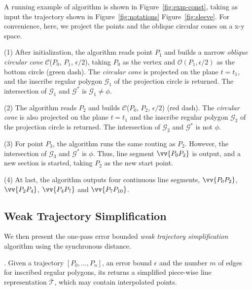 \begin{example}
\label{exm-alg-conest}
A running example of algorithm \cist is shown in Figure~\ref{fig:exm-const},  taking as input the trajectory shown in Figure~\ref{fig:notations} Figure~\ref{fig:sleeve}.
For convenience, here, we project the points and the oblique circular cones on a x-y space.

\ni (1) After initialization, the \cist algorithm reads point $P_1$ and builds a narrow \emph{oblique circular cone} $\mathcal{C}$($P_0$, $P_{1}$, $\epsilon/2$), taking $P_0$ as the vertex and $\mathcal{O}(P_1, \epsilon/2)$ as the bottom circle (green dash). The \emph{circular cone} is projected on the plane $t=t_1$, and the inscribe regular polygon $\mathcal{G}_1$ of the projection circle is returned. The intersection of $\mathcal{G}_1$ and $\mathcal{G}^*$ is $\mathcal{G}_1 \ne \phi$.

\ni (2) The algorithm reads $P_2$ and builds $\mathcal{C}$($P_0$, $P_{2}$, $\epsilon/2$) (red dash). The \emph{circular cone} is also projected on the plane $t=t_1$ and the inscribe regular polygon $\mathcal{G}_2$ of the projection circle is returned. The intersection of $\mathcal{G}_2$ and $\mathcal{G}^*$ is not $\phi$.

\ni (3) For point $P_3$, the algorithm runs the same routing as $P_2$. However, the intersection of $\mathcal{G}_3$ and $\mathcal{G}^*$ is $\phi$. Thus, line segment $\vv{P_0P_2}$ is output, and a new section is started, taking $P_2$ as the new start point.

\ni (4) At last, the algorithm outputs four continuous line segments, \ie $\vv{P_0P_2}$, $\vv{P_2P_4}$, $\vv{P_4P_{7}}$ and $\vv{P_7P_{10}}$.
\end{example}





\subsection{Weak Trajectory Simplification}

We then present the one-pass error bounded {\em weak trajectory simplification} algorithm using the synchronous distance.




.
Given a trajectory ${[P_0, \ldots, P_n]}$, an error bound $\epsilon$ and the number $m$ of edges for inscribed
regular polygons, its returns a simplified  piece-wise line representation $\overline{\mathcal{T}}$,
which may contain interpolated points.

